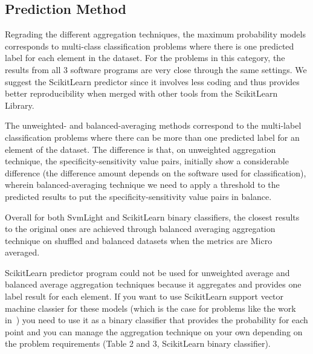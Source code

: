 \subsection{Prediction Method}
Regrading the different aggregation techniques, the maximum probability models corresponds to multi-class classification 
problems where there is one predicted label for each element in the dataset. For the problems in this category, 
the results from all 3 software programs are very close through the same settings. We suggest the ScikitLearn predictor 
since it involves less coding and thus provides better reproducibility when merged with other tools from the ScikitLearn Library.

The unweighted- and balanced-averaging methods correspond to the multi-label classification problems where there can 
be more than one predicted label for an element of the dataset. The difference is that, on unweighted aggregation technique, 
the specificity-sensitivity value pairs, initially show a considerable difference (the difference amount depends on 
the software used for classification), wherein balanced-averaging technique we need to apply a threshold to
the predicted results to put the specificity-sensitivity value pairs in balance.

Overall for both SvmLight and ScikitLearn binary classifiers, the closest results to the original ones are achieved through 
balanced averaging aggregation technique on shuffled and balanced datasets when the metrics are Micro averaged.

ScikitLearn predictor program could not be used for unweighted average and balanced average aggregation techniques because 
it aggregates and provides one label result for each element. If you want to use ScikitLearn support vector machine 
classier for these models (which is the case for problems like the work in~\cite{mishra2014prediction}) 
you need to use it as a binary classifier that provides the probability for each point and you can manage the 
aggregation technique on your own depending on the problem requirements (Table 2 and 3, ScikitLearn binary classifier).


